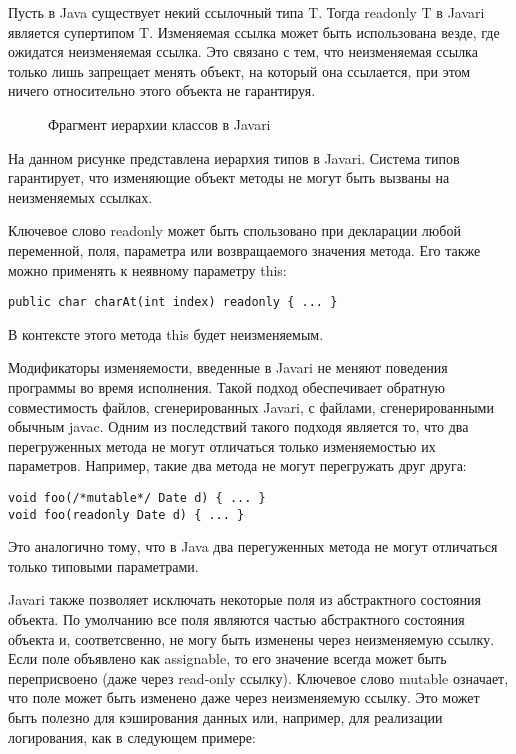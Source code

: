 Пусть в Java существует некий ссылочный типа T. Тогда readonly T в Javari является супертипом T. Изменяемая ссылка может быть использована везде, где ожидатся неизменяемая ссылка. Это связано с тем, что неизменяемая ссылка только лишь запрещает менять объект, на который она ссылается, при этом ничего относительно этого объекта не гарантируя. 

\begin{figure}[h]
\caption{Фрагмент иерархии классов в Javari}
\label{pic:javari_classes}
\end{figure}

На данном рисунке представлена иерархия типов в Javari. Система типов гарантирует, что изменяющие объект методы не могут быть вызваны на неизменяемых ссылках.

Ключевое слово readonly может быть спользовано при декларации любой переменной, поля, параметра или возвращаемого значения метода. Его также можно применять к неявному параметру this:

\begin{lstlisting}[caption=readonly метод, label=code:readonly_method]
public char charAt(int index) readonly { ... }
\end{lstlisting}

В контексте этого метода this будет неизменяемым.

Модификаторы изменяемости, введенные в Javari не меняют поведения программы во время исполнения. Такой подход обеспечивает обратную совместимость файлов, сгенерированных Javari, с файлами, сгенерированными обычным javac. Одним из последствий такого подходя является то, что два перегруженных метода не могут отличаться только изменяемостью их параметров. Например, такие два метода не могут перегружать друг друга:

\begin{lstlisting}[caption=Перегрузка методов, label=code:javari_method_overloading]
void foo(/*mutable*/ Date d) { ... } 
void foo(readonly Date d) { ... }
\end{lstlisting}

Это аналогично тому, что в Java два перегуженных метода не могут отличаться только типовыми параметрами.

Javari также позволяет исключать некоторые поля из абстрактного состояния объекта. По умолчанию все поля являются частью абстрактного состояния объекта и, соответсвенно, не могу быть изменены через неизменяемую ссылку. Если поле объявлено как assignable, то его значение всегда может быть переприсвоено (даже через read-only ссылку). Ключевое слово mutable означает, что поле может быть изменено даже через неизменяемую ссылку. Это может быть полезно для кэширования данных или, например, для реализации логирования, как в следующем примере:

